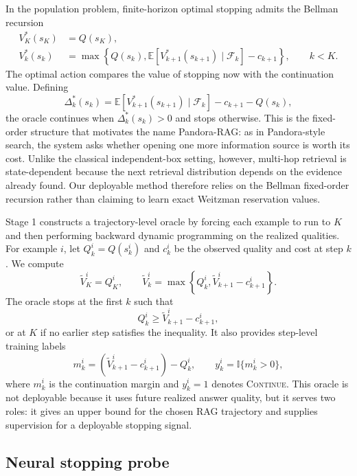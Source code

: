 \documentclass{article}
\newcommand{\method}{Pandora-RAG}
\begin{document}
In the population problem, finite-horizon optimal stopping admits the Bellman recursion
\begin{align}
  V_K^*(s_K) &= Q(s_K), \\
  V_k^*(s_k) &=
  \max\left\{
    Q(s_k),
    \mathbb{E}\left[V_{k+1}^*(s_{k+1})\mid\mathcal{F}_k\right]-c_{k+1}
  \right\},
  \qquad k<K .
  \label{eq:bellman}
\end{align}
The optimal action compares the value of stopping now with the continuation value. Defining
\[
  \Delta_k^*(s_k)=
  \mathbb{E}\left[V_{k+1}^*(s_{k+1})\mid\mathcal{F}_k\right]
  -c_{k+1}-Q(s_k),
\]
the oracle continues when $\Delta_k^*(s_k)>0$ and stops otherwise. This is the fixed-order structure that motivates the name \method{}: as in Pandora-style search, the system asks whether opening one more information source is worth its cost. Unlike the classical independent-box setting, however, multi-hop retrieval is state-dependent because the next retrieval distribution depends on the evidence already found. Our deployable method therefore relies on the Bellman fixed-order recursion rather than claiming to learn exact Weitzman reservation values.

Stage 1 constructs a trajectory-level oracle by forcing each example to run to $K$ and then performing backward dynamic programming on the realized qualities. For example $i$, let $Q_k^i=Q(s_k^i)$ and $c_k^i$ be the observed quality and cost at step $k$. We compute
\begin{equation}
  \widetilde V_K^i=Q_K^i,\qquad
  \widetilde V_k^i=\max\left\{Q_k^i,\widetilde V_{k+1}^i-c_{k+1}^i\right\}.
  \label{eq:trajectory-dp}
\end{equation}
The oracle stops at the first $k$ such that
\[
  Q_k^i \ge \widetilde V_{k+1}^i-c_{k+1}^i,
\]
or at $K$ if no earlier step satisfies the inequality. It also provides step-level training labels
\begin{equation}
  m_k^i=(\widetilde V_{k+1}^i-c_{k+1}^i)-Q_k^i,
  \qquad
  y_k^i=\mathbb{I}\{m_k^i>0\},
  \label{eq:oracle-labels}
\end{equation}
where $m_k^i$ is the continuation margin and $y_k^i=1$ denotes \textsc{Continue}. This oracle is not deployable because it uses future realized answer quality, but it serves two roles: it gives an upper bound for the chosen RAG trajectory and supplies supervision for a deployable stopping signal.

\subsection{Neural stopping probe}
\label{sec:probe}
\end{document}
